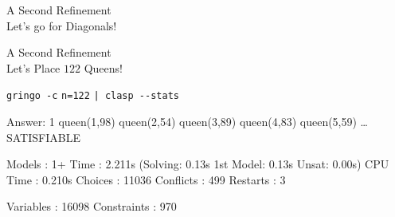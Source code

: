 \begin{frame}[fragile]{A Second Refinement\\
                       \normalsize Let's go for Diagonals!}
\begin{block}{}


\end{block}
\end{frame}
\begin{frame}[fragile]{A Second Refinement\\
              \normalsize Let's Place \alert{$122$} Queens!}
\begin{block}{\alert<1>{\lstinline{gringo -c} \alert{\lstinline{n=122}}  \lstinline{| clasp --stats}}}
\vspace*{-3mm}
\pause\footnotesize%
\begin{semiverbatim}
Answer: 1
queen(1,98) queen(2,54) queen(3,89) queen(4,83) queen(5,59) \dots{}
SATISFIABLE

Models      : 1+
\alert<2>{Time        : 2.211s} (Solving: 0.13s 1st Model: 0.13s Unsat: 0.00s)
CPU Time    : 0.210s
Choices     : 11036
\alert<2>{Conflicts   : 499}
Restarts    : 3

\alert<3>{Variables   : 16098}
\alert<3>{Constraints : 970}
\end{semiverbatim}
\end{block}
\end{frame}
